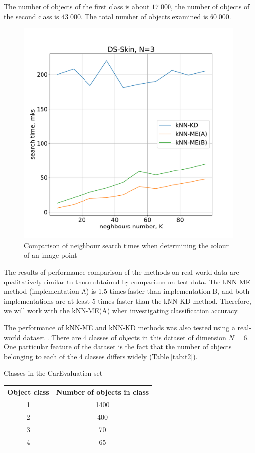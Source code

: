\documentclass[entropy,article,submit,moreauthors,pdftex]{Definitions/mdpi}
\begin{document}
\begin{paracol}{2}
The number of objects of the first class is about $17\;000$, the number of objects of the second class is $43\;000$. The total number of objects examined is $60\;000$.

\begin{figure}[h]
\widefigure
\includegraphics[width=0.5\linewidth]{fig6.pdf}
\caption{Comparison of neighbour search times when determining the colour of an image point\label{fig6}}
\end{figure}

The results of performance comparison of the methods on real-world data are qualitatively similar to those obtained by comparison on test data. The kNN-ME method (implementation A) is 1.5 times faster than implementation B, and both implementations are at least 5 times faster than the kNN-KD method. Therefore, we will work with the kNN-ME(A) when investigating classification accuracy.

The performance of kNN-ME and kNN-KD methods was also tested using a real-world dataset \cite{ds-2}. There are 4 classes of objects in this dataset of dimension $N = 6$. One particular feature of the dataset is the fact that the number of objects belonging to each of the 4 classes differs widely (Table \ref{tab:t2}).

\begin{specialtable}[H] 
  \caption{Classes in the CarEvaluation set}\label{tab:t2}
	\center
\begin{tabular}{cc}
\toprule
	  Object class & Number of objects in class \\
\midrule													
		1 & 1400 \\ 
		2 & 400 \\
		3 & 70 \\
		4 & 65 \\
\bottomrule
\end{tabular}
\end{specialtable}


\end{paracol}
\end{document}
